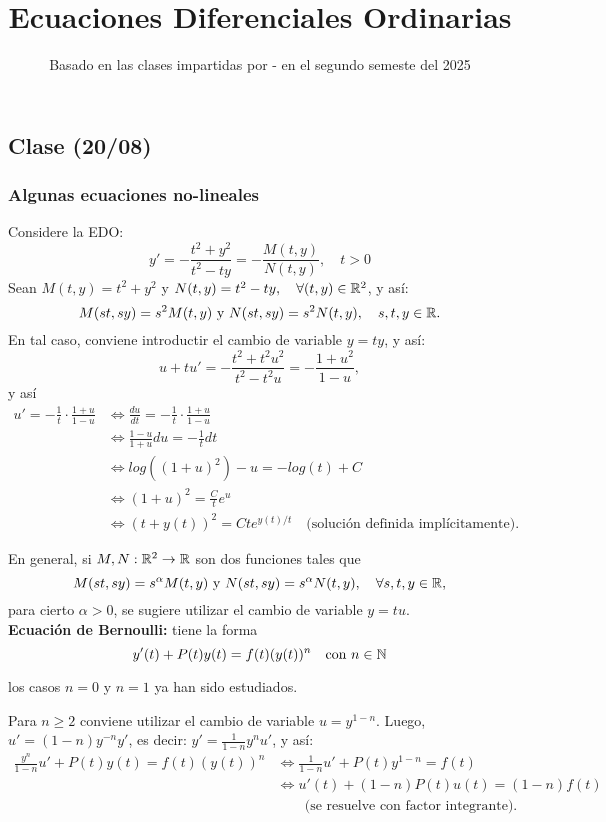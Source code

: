 \documentclass[a4paper]{report}
\title{Ecuaciones Diferenciales Ordinarias}
\author{}
\date{Basado en las clases impartidas por - en el segundo semeste del 2025}
\begin{document}
\maketitle
\chapter{}
\setcounter{section}{0}
\section{Clase (20/08)}
\subsection{Algunas ecuaciones no-lineales}

\begin{eg}
	Considere la EDO:
	\[
	y' = -\frac{t^2 + y^2}{t^2 - ty} = -\frac{M(t,y)}{N(t,y)}, \quad t > 0
	\]
	Sean $M(t,y) =  t^2 + y^2$ y $N(t,y) = t^2 - ty, \quad \forall (t,y) \in \mathbb{R}^2$, y así:
	\[
	M(st,sy) = s^2 M(t,y) \text{ y } N(st,sy) = s^2 N(t,y), \quad s,t,y \in \mathbb{R}.
	\]
	En tal caso, conviene introductir el cambio de variable $y = ty$, y así:
	\[
	u+tu' = -\frac{t^2+t^2u^2}{t^2-t^2u} = - \frac{1+u^2}{1-u},
	\]
	y así
	\begin{align*}
		u' = -\frac{1}{t}\cdot \frac{1+u}{1-u} &\iff \frac{du}{dt} = -\frac{1}{t}\cdot \frac{1+u}{1-u} \\
		& \iff \frac{1-u}{1+u} du = - \frac{1}{t} dt \\
		& \iff log ((1+u)^2)-u = -log (t) + C \\
		& \iff (1+u)^2 = \frac{C}{t} e^u \\
		& \iff (t + y(t))^2 = Ct e^{y(t)/t} \quad \text{(solución definida implícitamente)}
	.\end{align*}
\end{eg}
	\noindent En general, si $M,N : \mathbb{R}^2 \to \mathbb{R}$ son dos funciones tales que
	\[
	M(st,sy)= s^{\alpha} M(t,y) \text{ y } N(st,sy) = s^{\alpha} N(t,y),\quad \forall s,t,y\in \mathbb{R},
	\]
	\noindent para cierto $\alpha> 0$, se sugiere utilizar el cambio de variable $y = tu$.\\

	\noindent \textbf{Ecuación de Bernoulli:} tiene la forma
	\[
	y'(t) + P(t)y(t) = f(t)(y(t))^n \quad \text{con } n \in \mathbb{N}
	\]
	\begin{note}
		los casos $n=0$ y $n=1$ ya han sido estudiados.
	\end{note}

	\noindent Para $n\geq 2$ conviene utilizar el cambio de variable $u = y^{1-n}$. Luego, $u' = (1-n)y^{-n}y'$, es decir: $y' = \frac{1}{1-n} y^n u'$, y así:
	\begin{align*}
		\frac{y^n}{1-n} u' + P(t)y(t) = f(t)(y(t))^n & \iff \frac{1}{1-n} u' + P(t) y^{1-n} = f(t) \\
		& \iff u'(t) + (1-n) P(t) u(t) = (1-n) f(t) \\ 
		& \qquad \text{(se resuelve con factor integrante)}
	.\end{align*}
\end{document}

